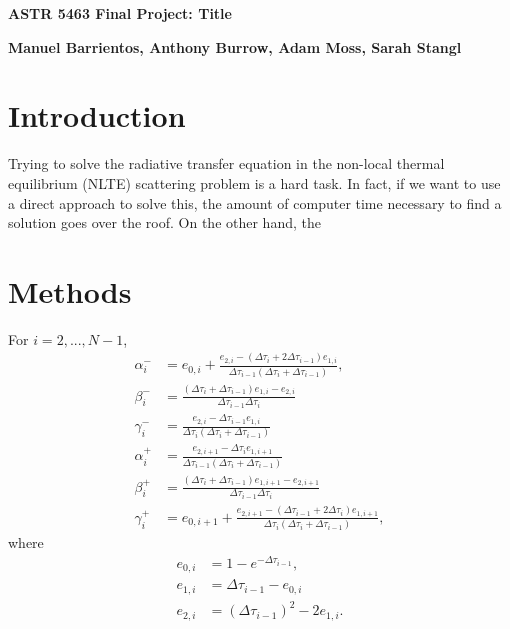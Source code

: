 \documentclass[12pt]{article}
\begin{document}
\begin{center}\begin{LARGE}
\textbf{ASTR 5463 Final Project: Title}
\end{LARGE}\end{center}

\begin{center}
\textbf{Manuel Barrientos, Anthony Burrow, Adam Moss, Sarah Stangl}
\end{center}

\section{Introduction}

Trying to solve the radiative transfer equation in the non-local thermal equilibrium (NLTE) scattering problem is a hard task. In fact, if we want to use a direct approach to solve this, the amount of computer time necessary to find a solution goes over the roof. On the other hand, the 




\section{Methods}

For $i = 2, ..., N - 1$,
\begin{align*}
\alpha_i^-
&=
e_{0, i} +
\frac{e_{2, i} - (\Delta\tau_i + 2\Delta\tau_{i - 1}) e_{1, i}}
     {\Delta\tau_{i - 1} (\Delta\tau_i + \Delta\tau_{i - 1})},
\\ \beta_i^-
&=
\frac{(\Delta\tau_i + \Delta\tau_{i - 1}) e_{1, i} - e_{2, i}}
     {\Delta\tau_{i - 1} \Delta\tau_i}
\\ \gamma_i^-
&=
\frac{e_{2, i} - \Delta\tau_{i - 1} e_{1, i}}
     {\Delta\tau_i (\Delta\tau_i + \Delta\tau_{i - 1})}
\\ \alpha_i^+
&=
\frac{e_{2, i + 1} - \Delta\tau_i e_{1, i + 1}}
     {\Delta\tau_{i - 1} (\Delta\tau_i + \Delta\tau_{i - 1})}
\\ \beta_i^+
&=
\frac{(\Delta\tau_i + \Delta\tau_{i - 1}) e_{1, i + 1} - e_{2, i + 1}}
     {\Delta\tau_{i - 1} \Delta\tau_i}
\\ \gamma_i^+
&=
e_{0, i + 1} +
\frac{e_{2, i + 1} - (\Delta\tau_{i - 1} + 2\Delta\tau_i) e_{1, i + 1}}
     {\Delta\tau_i (\Delta\tau_i + \Delta\tau_{i - 1})},
\end{align*}
where
\begin{align*}
e_{0, i}
&=
1 - e^{-\Delta\tau_{i - 1}},
\\ e_{1, i}
&=
\Delta\tau_{i - 1} - e_{0, i}
\\ e_{2, i}
&=
(\Delta\tau_{i - 1})^2 - 2 e_{1, i}.
\end{align*}
\end{document}
